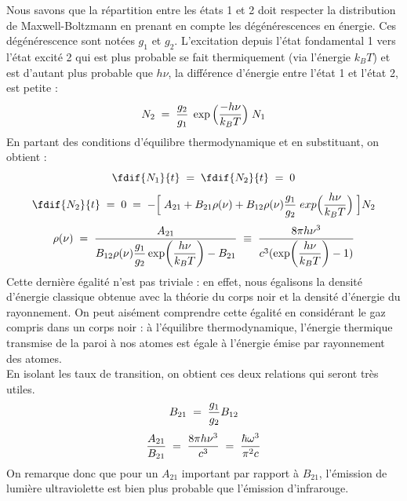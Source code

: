\noindent Nous savons que la répartition entre les états 1 et 2 doit respecter la distribution de Maxwell-Boltzmann en prenant en compte les dégénérescences en énergie. Ces dégénérescence sont notées $g_1$ et $g_2$. L'excitation depuis l'état fondamental 1 vers l'état excité 2 qui est plus probable se fait thermiquement (via l'énergie $k_BT$) et est d'autant plus probable que $h\nu$, la différence d'énergie entre l'état 1 et l'état 2, est petite :
\[
    N_2 \; = \; \dfrac{g_2}{g_1} \; \exp\Big(\dfrac{-h\nu}{k_BT}\Big) \;N_1
\]
En partant des conditions d'équilibre thermodynamique et en substituant, on obtient :
\[
    \fdif{N_1}{t} \eq \fdif{N_2}{t} \eq 0
\]
\[
    \fdif{N_2}{t}
    \eq 0
    \eq - \Big[\;A_{21} + B_{21} \rho(\nu) + B_{12}\rho(\nu) \dfrac{g_1}{g_2} \; exp\Big(\dfrac{h\nu}{k_BT}\Big) \;\Big] N_2
\]
\[
    \rho(\nu)
    \; = \; \dfrac{A_{21}}{B_{12}\rho(\nu) \dfrac{g_1}{g_2} \exp(\dfrac{h\nu}{k_BT}) - B_{21}}
    \;\equiv\; \dfrac{8\pi h \nu^3}{c^3(\exp(\dfrac{h\nu}{k_BT})-1)}
\]
Cette dernière égalité n'est pas triviale : en effet, nous égalisons la densité d'énergie classique obtenue avec la théorie du corps noir et la densité d'énergie du rayonnement. On peut aisément comprendre cette égalité en considérant le gaz compris dans un corps noir : à l'équilibre thermodynamique, l'énergie thermique transmise de la paroi à nos atomes est égale à l'énergie émise par rayonnement des atomes.\\
En isolant les taux de transition, on obtient ces deux relations qui seront très utiles.
\begin{equation}
    B_{21} \; = \; \dfrac{g_1}{g_2}B_{12}
    \label{eq:equilire1}
\end{equation}
\begin{equation}
    \dfrac{A_{21}}{B_{21}}
    \; = \; \dfrac{8\pi h \nu^3}{c^3}
    \; = \; \dfrac{\hbar \omega^3}{\pi^2c}
    \label{eq:equilire2}
\end{equation}
On remarque donc que pour un $A_{21}$ important par rapport à $B_{21}$, l'émission de lumière ultraviolette est bien plus probable que l'émission d'infrarouge.


